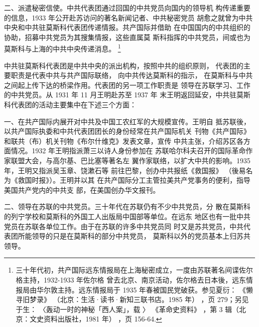 二、派遣秘密信使。中共代表团通过回国的中共党员向国内的领导机
构传递重要的信息，1933 年公开赴苏访问的著名新闻记者、中共秘密党员
胡愈之就曾为中共中央和中共驻莫斯科代表团传递情报。共产国际并借助
在中国国内的中共组织的协助，招募中共党员为其搜集情报，这些直属莫
斯科指挥的中共党员，间或也为莫斯科与上海的中共中央传递消息。
\footnote{三十年代初，共产国际远东情报局在上海秘密成立，一度由苏联著名间谍佐尔格主持，1932-1933 年佐尔格
曾去北京、南京活动，佐尔格去日本後，远东情报局由华尔敦主持。远东情报局于 1935 年春被国民党破获。参见夏衍：
《懒寻旧梦录》
（北京：生活·读书·新知三联书店。1985 年）
，页 279；另见于生：
〈轰动一时的神秘「西人案」，载
〉
《革命史资料》
，第 3 辑（北京：文史资料出版社，1981 年）
，页 156-64.}

中共驻莫斯科代表团是中共中央的派出机构，按照中共的组织原则，
代表团的主要职责是代表中共与共产国际联络，
向中共传达莫斯科的指示，
在莫斯科与中共之间起上传下达的桥梁作用。代表团的另一项工作职责是
领导在苏联学习、工作的中共党员。从 1931 年 11 月王明赴苏至 1937 年
末王明返回延安，中共驻莫斯科代表团的活动主要集中在下述三个方面：

一、在共产国际内展开对中共及中国工农红军的大规模宣传。王明自
抵苏联後，以共产国际执委和中共代表团团长的身份经常在共产国际机关
刊物《共产国际》和联共（布）机关刊物《布尔什维克》发表文章，宣传
中共主张，介绍苏区各方面情况。1932 年王明指派萧三以诗人身份参加在
苏联哈尔科夫召开的国际革命作家联盟大会，与高尔基、巴比塞等著名左
翼作家联络，以扩大中共的影响。1935 年，王明又指派吴玉章、饶漱石等
前往巴黎，创办中共报纸《救国报》
（後易名为《救国时报》）。王明并以其 
在共产国际分工主管拉美共产党事务的便利，指导美国共产党内的中共支
部，在美国创办华文报刊。

二、领导在苏联的中共党员。三十年代在苏联仍有不少中共党员，分
散在莫斯科的列宁学校和莫斯科的外国工人出版局中国部等单位。在远东
地区也有一批中共党员在苏联各单位工作。由于在苏联的许多中共党员同
时又是苏共党员，中共代表团所能领导的只是在莫斯科的部分中共党员，
莫斯科以外的党员基本上归苏共领导。

